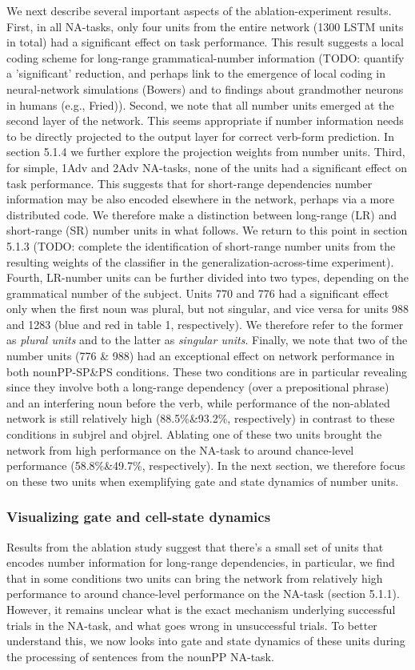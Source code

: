We next describe several important aspects of the ablation-experiment results. First, in all NA-tasks, only four units from the entire network (1300 LSTM units in total) had a significant effect on task performance. This result suggests a local coding scheme for long-range grammatical-number information (TODO: quantify a 'significant' reduction, and perhaps link to the emergence of local coding in neural-network simulations (Bowers) and to findings about grandmother neurons in humans (e.g., Fried)). Second, we note that all number units emerged at the second layer of the network. This seems appropriate if number information needs to be directly projected to the output layer for correct verb-form prediction. In section 5.1.4 we further explore the projection weights from number units. Third, for simple, 1Adv and 2Adv NA-tasks, none of the units had a significant effect on task performance. This suggests that for short-range dependencies number information may be also encoded elsewhere in the network, perhaps via a more distributed code. We therefore make a distinction between long-range (LR) and short-range (SR) number units in what follows. We return to this point in section 5.1.3 (TODO: complete the identification of short-range number units from the resulting weights of the classifier in the generalization-across-time experiment). Fourth, LR-number units can be further divided into two types, depending on the grammatical number of the subject. Units 770 and 776 had a significant effect only when the first noun was plural, but not singular, and vice versa for units 988 and 1283 (blue and red in table 1, respectively). We therefore refer to the former as \textit{plural units} and to the latter as \textit{singular units}. Finally, we note that two of the number units (776 \& 988) had an exceptional effect on network performance in both nounPP-SP\&PS conditions. These two conditions are in particular revealing since they involve both a long-range dependency (over a prepositional phrase) and an interfering noun before the verb, while performance of the non-ablated network is still relatively high (88.5\%\&93.2\%, respectively) in contrast to these conditions in subjrel and objrel. Ablating one of these two units brought the network from high performance on the NA-task to around chance-level performance (58.8\%\&49.7\%, respectively). In the next section, we therefore focus on these two units when exemplifying gate and state dynamics of number units. 

\subsubsection{Visualizing gate and cell-state dynamics}
Results from the ablation study suggest that there's a small set of units that encodes number information for long-range dependencies, in particular, we find that in some conditions two units can bring the network from relatively high performance to around chance-level performance on the NA-task (section 5.1.1). However, it remains unclear what is the exact mechanism underlying successful trials in the NA-task, and what goes wrong in unsuccessful trials. To better understand this, we now looks into gate and state dynamics of these units during the processing of sentences from the nounPP NA-task. 

